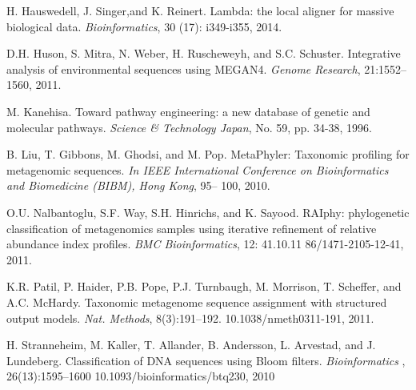 \documentclass[10pt, a4paper]{report}[08.12.2015]
\begin{document}
\begin{thebibliography}{16}
       H. Hauswedell, J. Singer,and K. Reinert. Lambda: the local aligner for 	  massive biological data. \textit{Bioinformatics}, 30 (17): 		  			  i349-i355, 2014. 
      
      D.H. Huson, S. Mitra, N. Weber, H. Ruscheweyh, and S.C. Schuster. 			  Integrative analysis of environmental sequences using MEGAN4.
      \textit{Genome Research}, 21:1552–1560, 2011.
       
      M. Kanehisa. Toward pathway engineering: a new database of genetic and 	  	  molecular pathways. \textit{Science \& Technology Japan}, No. 59, pp. 		  34-38, 1996. 
      
      
	  B. Liu, T. Gibbons, M. Ghodsi, and M. Pop. MetaPhyler: Taxonomic 				  profiling for metagenomic sequences. \textit{In IEEE International 			  Conference on Bioinformatics and Biomedicine (BIBM), Hong Kong}, 95–			  100, 2010.
	  
	  O.U. Nalbantoglu, S.F. Way, S.H. Hinrichs, and K. Sayood. RAIphy: 			  phylogenetic classification of metagenomics samples using iterative 			  refinement of relative abundance index profiles. \textit{BMC 					  Bioinformatics}, 12: 41.10.11 86/1471-2105-12-41, 2011. 
	  
	  K.R. Patil, P. Haider, P.B. Pope, P.J. Turnbaugh, M. Morrison, T. 			  Scheffer, and A.C. McHardy. Taxonomic metagenome sequence assignment 			  with structured output models. \textit{Nat. Methods}, 8(3):191–192. 			  10.1038/nmeth0311-191, 2011.
		 
	  
	  H. Stranneheim, M. Kaller, T. Allander, B. Andersson, L. Arvestad,
	  and J. Lundeberg. Classification of DNA sequences using Bloom filters. 		  \textit{Bioinformatics }, 26(13):1595–1600 									  10.1093/bioinformatics/btq230,  2010
	  
	  	 
	  

    \end{thebibliography}
\end{document}
